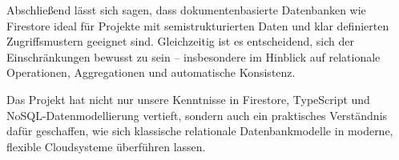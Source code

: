 \documentclass[12pt,a4paper%
              ,oneside     %
              ,titlepage
              ,DIV=13
              ,headinclude
              ,footinclude=false%
              ,cleardoublepage=empty%
              ,parskip=half,
              BCOR=0mm,
              ]{scrreprt}
\begin{document}
Abschließend lässt sich sagen, dass dokumentenbasierte Datenbanken wie Firestore ideal für Projekte mit semistrukturierten Daten und klar definierten Zugriffsmustern geeignet sind. Gleichzeitig ist es entscheidend, sich der Einschränkungen bewusst zu sein – insbesondere im Hinblick auf relationale Operationen, Aggregationen und automatische Konsistenz.

Das Projekt hat nicht nur unsere Kenntnisse in Firestore, TypeScript und NoSQL-Datenmodellierung vertieft, sondern auch ein praktisches Verständnis dafür geschaffen, wie sich klassische relationale Datenbankmodelle in moderne, flexible Cloudsysteme überführen lassen.


\appendix




\renewcommand{\bibfont}{\footnotesize}
\printbibliography[title={Literaturverzeichnis}, 
                   heading=bibintoc]


{ %
\printindex
}
\end{document}
